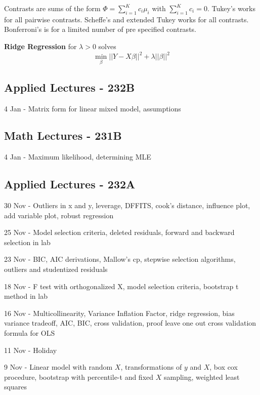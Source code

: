 \documentclass[10pt, twocolumn]{article}
\begin{document}
Contrasts are sums of the form $\Phi = \sum_{i=1}^K c_i \mu_i$ with
$\sum_{i=1}^K c_i = 0$.
Tukey's works for all pairwise contrasts.
Scheffe's and extended Tukey works for all contrasts.
Bonferroni's is for a limited number of pre specified contrasts.

\textbf{Ridge Regression} for $\lambda > 0$ solves
\[
    \min_\beta ||Y - X\beta||^2 + \lambda ||\beta||^2
\]

\newpage

\subsection*{Applied Lectures - 232B}

4 Jan - Matrix form for linear mixed model, assumptions

\subsection*{Math Lectures - 231B}

4 Jan - Maximum likelihood, determining MLE

\newpage

\subsection*{Applied Lectures - 232A}

30 Nov - Outliers in x and y, leverage, DFFITS, cook's distance, influence
plot, add variable plot, robust regression

25 Nov - Model selection criteria, deleted residuals, forward and backward
selection in lab

23 Nov - BIC, AIC derivations, Mallow's cp, stepwise selection algorithms,
outliers and studentized residuals

18 Nov - F test with orthogonalized X, model selection criteria,
bootstrap t method in lab

16 Nov - Multicollinearity, Variance Inflation Factor,
ridge regression, bias variance tradeoff, AIC, BIC, cross validation, proof leave
one out cross validation formula for OLS 

11 Nov - Holiday

9 Nov - Linear model with random $X$, transformations of $y$ and $X$, box
cox procedure, bootstrap with percentile-t and fixed $X$ sampling, weighted
least squares
\end{document}
